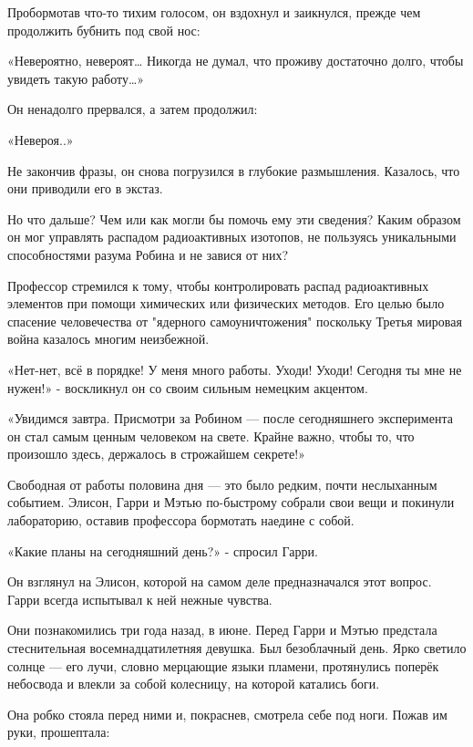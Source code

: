 \documentclass[a4paper,12pt]{book}
\begin{document}
\par
Пробормотав что-то тихим голосом, он вздохнул и заикнулся, прежде чем продолжить бубнить под свой нос:
\par
«Невероятно, невероят… Никогда не думал, что проживу достаточно долго, чтобы увидеть такую работу…»
\par
Он ненадолго прервался, а затем продолжил:
\par
«Невероя..»
\par
Не закончив фразы, он снова погрузился в глубокие размышления. Казалось, что они приводили его в экстаз.
\par
Но что дальше? Чем или как могли бы помочь ему эти сведения? Каким образом он мог управлять распадом радиоактивных изотопов, не пользуясь уникальными способностями разума Робина и не завися от них?
\par
Профессор стремился к тому, чтобы контролировать распад радиоактивных элементов при помощи химических или физических методов. Его целью было спасение человечества от "ядерного самоуничтожения" поскольку Третья мировая война казалось многим неизбежной.\\
\par
«Нет-нет, всё в порядке! У меня много работы. Уходи! Уходи! Сегодня ты мне не нужен!» - воскликнул он со своим сильным немецким акцентом.
\par
«Увидимся завтра. Присмотри за Робином — после сегодняшнего эксперимента он стал самым ценным человеком на свете. Крайне важно, чтобы то, что произошло здесь, держалось в строжайшем секрете!»
\par
Свободная от работы половина дня — это было редким, почти неслыханным событием. Элисон, Гарри и Мэтью по-быстрому собрали свои вещи и покинули лабораторию, оставив профессора бормотать наедине с собой.\\
\par
«Какие планы на сегодняшний день?» - спросил Гарри.
\par
Он взглянул на Элисон, которой на самом деле предназначался этот вопрос. Гарри всегда испытывал к ней нежные чувства.
\par
Они познакомились три года назад, в июне. Перед Гарри и Мэтью предстала стеснительная восемнадцатилетняя девушка. Был безоблачный день. Ярко светило солнце — его лучи, словно мерцающие языки пламени, протянулись поперёк небосвода и влекли за собой колесницу, на которой катались боги.
\par
Она робко стояла перед ними и, покраснев, смотрела себе под ноги. Пожав им руки, прошептала:
\end{document}
